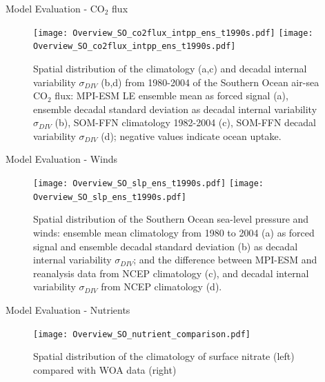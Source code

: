 \documentclass[aspectratio=169]{beamer}
\begin{document}
\begin{frame}{Model Evaluation - CO$_2$ flux}
	\begin{figure}%
	\centering
	\texttt{[image: Overview\_SO\_co2flux\_intpp\_ens\_t1990s.pdf]} %
	\texttt{[image: Overview\_SO\_co2flux\_intpp\_ens\_t1990s.pdf]} %
	\caption{Spatial distribution of the climatology (a,c) and decadal internal variability $\sigma_{DIV}$ (b,d) from 1980-2004 of the Southern Ocean air-sea CO$_2$ flux: MPI-ESM LE ensemble mean as forced signal (a), ensemble decadal standard deviation as decadal internal variability $\sigma_{DIV}$ (b), SOM-FFN climatology 1982-2004 (c), SOM-FFN decadal variability $\sigma_{DIV}$ (d); negative values indicate ocean uptake.}
	\label{fig:SOCS_ensmean_ensstd}
\end{figure}

\end{frame}


\begin{frame}{Model Evaluation - Winds}
\begin{figure}[h!]
	\centering
	\texttt{[image: Overview\_SO\_slp\_ens\_t1990s.pdf]} %
	\texttt{[image: Overview\_SO\_slp\_ens\_t1990s.pdf]} %
	\caption{Spatial distribution of the Southern Ocean sea-level pressure and winds: ensemble mean climatology from 1980 to 2004 (a) as forced signal and ensemble decadal standard deviation (b) as decadal internal variability $\sigma_{DIV}$; and the difference between MPI-ESM and reanalysis data from NCEP climatology (c), and decadal internal variability $\sigma_{DIV}$ from NCEP climatology (d).}
	\label{fig:SO_winds_ensmean_ensstd}
\end{figure}
\end{frame}

\begin{frame}{Model Evaluation - Nutrients}
\begin{figure}[h!]
	\centering
	\texttt{[image: Overview\_SO\_nutrient\_comparison.pdf]} %
	\caption{Spatial distribution of the climatology of surface nitrate (left) compared with WOA data \citep{WOA2013} (right)}
	\label{fig:SO_comp_nitrate}
\end{figure}
\end{frame}
\end{document}
